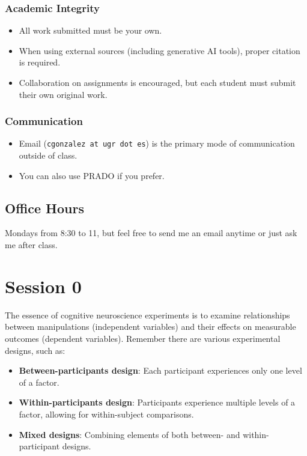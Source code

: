 \documentclass[
  letterpaper,
  DIV=11,
  numbers=noendperiod]{scrreprt}
\providecommand{\tightlist}{%
  \setlength{\itemsep}{0pt}\setlength{\parskip}{0pt}}\usepackage{longtable,booktabs,array}
\begin{document}
\hypertarget{academic-integrity}{%
\subsection{Academic Integrity}\label{academic-integrity}}

\begin{itemize}
\tightlist
\item
  All work submitted must be your own.
\item
  When using external sources (including generative AI tools), proper
  citation is required.
\item
  Collaboration on assignments is encouraged, but each student must
  submit their own original work.
\end{itemize}

\hypertarget{communication}{%
\subsection{Communication}\label{communication}}

\begin{itemize}
\tightlist
\item
  Email (\texttt{cgonzalez\ at\ ugr\ dot\ es}) is the primary mode of
  communication outside of class.
\item
  You can also use PRADO if you prefer.
\end{itemize}

\hypertarget{office-hours}{%
\section{Office Hours}\label{office-hours}}

Mondays from 8:30 to 11, but feel free to send me an email anytime or
just ask me after class.


\hypertarget{session-0}{%
\chapter{Session 0}\label{session-0}}

The essence of cognitive neuroscience experiments is to examine
relationships between manipulations (independent variables) and their
effects on measurable outcomes (dependent variables). Remember there are
various experimental designs, such as:

\begin{itemize}
\tightlist
\item
  \textbf{Between-participants design}: Each participant experiences
  only one level of a factor.
\item
  \textbf{Within-participants design}: Participants experience multiple
  levels of a factor, allowing for within-subject comparisons.
\item
  \textbf{Mixed designs}: Combining elements of both between- and
  within-participant designs.
\end{itemize}
\end{document}

